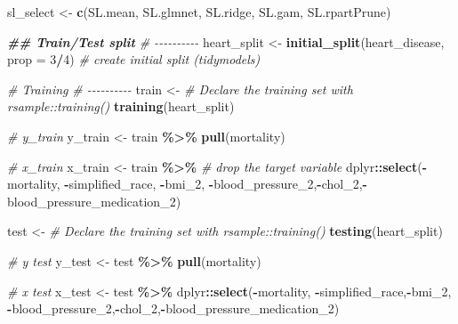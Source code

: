 \documentclass[
]{article}
\newenvironment{Shaded}{\begin{snugshade}}{\end{snugshade}}
\newcommand{\AttributeTok}[1]{\textcolor[rgb]{0.13,0.29,0.53}{#1}}
\newcommand{\CommentTok}[1]{\textcolor[rgb]{0.56,0.35,0.01}{\textit{#1}}}
\newcommand{\DecValTok}[1]{\textcolor[rgb]{0.00,0.00,0.81}{#1}}
\newcommand{\DocumentationTok}[1]{\textcolor[rgb]{0.56,0.35,0.01}{\textbf{\textit{#1}}}}
\newcommand{\FunctionTok}[1]{\textcolor[rgb]{0.13,0.29,0.53}{\textbf{#1}}}
\newcommand{\NormalTok}[1]{#1}
\newcommand{\OtherTok}[1]{\textcolor[rgb]{0.56,0.35,0.01}{#1}}
\newcommand{\SpecialCharTok}[1]{\textcolor[rgb]{0.81,0.36,0.00}{\textbf{#1}}}
\newcommand{\StringTok}[1]{\textcolor[rgb]{0.31,0.60,0.02}{#1}}
\begin{document}
\begin{Shaded}
\begin{Highlighting}[]
\NormalTok{sl\_select }\OtherTok{\textless{}{-}} \FunctionTok{c}\NormalTok{(}\StringTok{\textquotesingle{}SL.mean\textquotesingle{}}\NormalTok{,}
               \StringTok{\textquotesingle{}SL.glmnet\textquotesingle{}}\NormalTok{,}
               \StringTok{\textquotesingle{}SL.ridge\textquotesingle{}}\NormalTok{,}
               \StringTok{\textquotesingle{}SL.gam\textquotesingle{}}\NormalTok{,}
               \StringTok{\textquotesingle{}SL.rpartPrune\textquotesingle{}}\NormalTok{)}


\DocumentationTok{\#\# Train/Test split}
\CommentTok{\# {-}{-}{-}{-}{-}{-}{-}{-}{-}{-}}
\NormalTok{heart\_split }\OtherTok{\textless{}{-}} 
  \FunctionTok{initial\_split}\NormalTok{(heart\_disease, }\AttributeTok{prop =} \DecValTok{3}\SpecialCharTok{/}\DecValTok{4}\NormalTok{) }\CommentTok{\# create initial split (tidymodels)}


\CommentTok{\# Training }
\CommentTok{\# {-}{-}{-}{-}{-}{-}{-}{-}{-}{-}}
\NormalTok{train }\OtherTok{\textless{}{-}} 
  \CommentTok{\# Declare the training set with rsample::training()}
  \FunctionTok{training}\NormalTok{(heart\_split)}

\CommentTok{\# y\_train }
\NormalTok{y\_train }\OtherTok{\textless{}{-}} 
\NormalTok{  train }\SpecialCharTok{\%\textgreater{}\%} 
  \FunctionTok{pull}\NormalTok{(mortality)    }

\CommentTok{\# x\_train  }
\NormalTok{x\_train }\OtherTok{\textless{}{-}}
\NormalTok{  train }\SpecialCharTok{\%\textgreater{}\%}
  \CommentTok{\# drop the target variable}
\NormalTok{  dplyr}\SpecialCharTok{::}\FunctionTok{select}\NormalTok{(}\SpecialCharTok{{-}}\NormalTok{mortality, }\SpecialCharTok{{-}}\NormalTok{simplified\_race, }\SpecialCharTok{{-}}\NormalTok{bmi\_2, }\SpecialCharTok{{-}}\NormalTok{blood\_pressure\_2,}\SpecialCharTok{{-}}\NormalTok{chol\_2,}\SpecialCharTok{{-}}\NormalTok{blood\_pressure\_medication\_2)   }

\NormalTok{test }\OtherTok{\textless{}{-}}  
  \CommentTok{\# Declare the training set with rsample::training()}
  \FunctionTok{testing}\NormalTok{(heart\_split)}

\CommentTok{\# y test}
\NormalTok{y\_test }\OtherTok{\textless{}{-}} 
\NormalTok{  test }\SpecialCharTok{\%\textgreater{}\%}
  \FunctionTok{pull}\NormalTok{(mortality)}

\CommentTok{\# x test}
\NormalTok{x\_test }\OtherTok{\textless{}{-}} 
\NormalTok{  test }\SpecialCharTok{\%\textgreater{}\%}
\NormalTok{  dplyr}\SpecialCharTok{::}\FunctionTok{select}\NormalTok{(}\SpecialCharTok{{-}}\NormalTok{mortality, }\SpecialCharTok{{-}}\NormalTok{simplified\_race,}\SpecialCharTok{{-}}\NormalTok{bmi\_2, }\SpecialCharTok{{-}}\NormalTok{blood\_pressure\_2,}\SpecialCharTok{{-}}\NormalTok{chol\_2,}\SpecialCharTok{{-}}\NormalTok{blood\_pressure\_medication\_2)   }



\end{Highlighting}
\end{Shaded}
\end{document}

